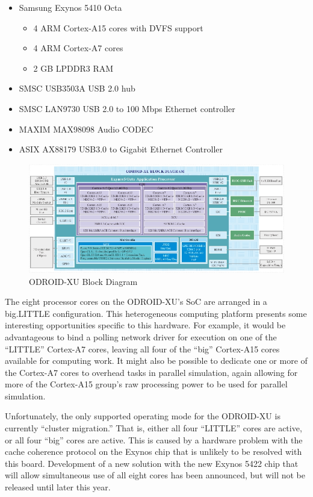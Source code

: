 \documentclass[11pt]{book}
\begin{document}
\begin{itemize}
\item Samsung Exynos 5410 Octa
  \begin{itemize}
  \item 4 ARM Cortex-A15 cores with DVFS support
  \item 4 ARM Cortex-A7 cores
  \item 2 GB LPDDR3 RAM
  \end{itemize}
\item SMSC USB3503A USB 2.0 hub
\item SMSC LAN9730 USB 2.0 to 100 Mbps Ethernet controller
\item MAXIM MAX98098 Audio CODEC
\item ASIX AX88179 USB3.0 to Gigabit Ethernet Controller
\end{itemize}

\begin{figure}
\centering
\includegraphics[width=\textwidth]{odroid_xu_block_diagram}
\caption{ODROID-XU Block Diagram
  \cite{odroid-xu-board-detail}}\label{odroid-xu-block-diagram}
\end{figure}

The eight processor cores on the ODROID-XU's SoC are arranged in a big.LITTLE
configuration.  This heterogeneous computing platform presents some interesting
opportunities specific to this hardware.  For example, it would be advantageous to bind a
polling network driver for execution on one of the ``LITTLE'' Cortex-A7 cores, leaving all
four of the ``big'' Cortex-A15 cores available for computing work.  It might also be
possible to dedicate one or more of the Cortex-A7 cores to overhead tasks in parallel
simulation, again allowing for more of the Cortex-A15 group's raw processing power to be
used for parallel simulation.

Unfortunately, the only supported operating mode for the ODROID-XU is currently ``cluster
migration.''  That is, either all four ``LITTLE'' cores are active, or all four ``big''
cores are active.  This is caused by a hardware problem with the cache coherence protocol
on the Exynos chip that is unlikely to be resolved with this board.  Development of a new
solution with the new Exynos 5422 chip that will allow simultaneous use of all eight cores
has been announced, but will not be released until later this year.
\end{document}
